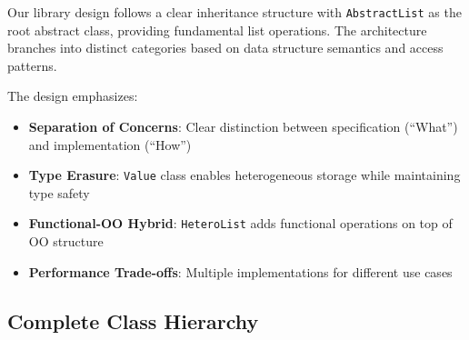 \documentclass[11pt,a4paper]{article}
\begin{document}
Our library design follows a clear inheritance structure with \texttt{AbstractList} as the root abstract class, providing fundamental list operations. The architecture branches into distinct categories based on data structure semantics and access patterns.

The design emphasizes:
\begin{itemize}
    \item \textbf{Separation of Concerns}: Clear distinction between specification (``What'') and implementation (``How'')
    \item \textbf{Type Erasure}: \texttt{Value} class enables heterogeneous storage while maintaining type safety
    \item \textbf{Functional-OO Hybrid}: \texttt{HeteroList} adds functional operations on top of OO structure
    \item \textbf{Performance Trade-offs}: Multiple implementations for different use cases
\end{itemize}

\subsection{Complete Class Hierarchy}
\end{document}
